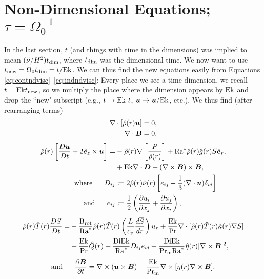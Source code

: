 \documentclass[12pt]{article}
\numberwithin{equation}{section}
\newcommand{\rhond}{\hat{\rho}}
\newcommand{\tmpnd}{\hat{T}}
\newcommand{\gnd}{\hat{g}}
\newcommand{\nund}{\hat{\nu}}
\newcommand{\kappand}{\hat{\kappa}}
\newcommand{\etand}{\hat{\eta}}
\begin{document}
\section{Non-Dimensional Equations; $\tau=\Omega_0^{-1}$}
In the last section, $t$ (and things with time in the dimensions) was implied to mean $(\tilde{\nu}/H^2) t_{\rm{dim}}$, where $t_{\rm{dim}}$ was the dimensional time. We now want to use $t_{\rm{new}}= \Omega_0t_{\rm{dim}} = t/{\rm{Ek}}$. We can thus find the new equations easily from Equations \eqref{eq:contndvisc}--\eqref{eq:indndvisc}: Every place we see a time dimension, we recall $t={\rm{Ek}} t_{\rm{new}}$, so we multiply the place where the dimension appears by ${\rm{Ek}}$ and drop the ``new" subscript (e.g., $t\rightarrow {\rm{Ek}}\ t$, $\bm{u}\rightarrow\bm{u}/{\rm{Ek}}$, etc.).  We thus find (after rearranging terms)
\begin{align}
	\Div[\rhond\ofr\vecu] &= 0\label{eq:contndrot},\\
	\Div \vecb &= 0,
\end{align}
\begin{subequations}\label{eq:momndrot}
	\begin{align}
		\rhond\ofr\left[\matderiv{\vecu} + 2\ez\times\vecu\right] = &-\rhond\ofr\nabla\left[ \frac{P}{\rhond\ofr} \right] + \ramod \rhond\ofr\gnd\ofr S\er, \nonumber\\
		&+ \ek \Div\bm{D} +(\curl\vecb)\times\vecb,\\
		\where D_{ij} &\define 2\rhond\ofr\nund\ofr \left[e_{ij} - \frac{1}{3}(\Div\vecu) \delta_{ij} \right]\\
		\andd e_{ij} &\define \frac{1}{2}\left(\pderiv{u_i}{x_j} + \pderiv{u_j}{x_i} \right),
	\end{align}
\end{subequations}
\begin{align}\label{eq:enndrot}
	\rhond\ofr\tmpnd\ofr \matderiv{S} = &- \frac{\brot}{\ramod} \rhond\ofr\tmpnd\ofr \left(\frac{L}{\cp}\frac{d\sref}{dr}\right) \ur + \frac{\ek}{\pr} \Div[\rhond\ofr \tmpnd\ofr \kappand\ofr \nabla S] \nonumber \\
	&+ \frac{\ek}{\pr} \hat{Q}(r) + \frac{\di\ek}{\ramod} D_{ij}e_{ij} + \frac{\di\ek}{\prm\ramod} \etand\ofr|\curl\vecb|^2,
\end{align}
\begin{align}\label{eq:indndrot}
	\text{and}\ \ \ \ \  \frac{\partial\bm{B}}{\partial t} = \nabla\times(\bm{u}\times\bm{B}) - \frac{{\rm{Ek}}}{{\rm{Pr_m}}} \nabla\times[\eta(r)\nabla\times\bm{B}].
\end{align}	
\end{document}
